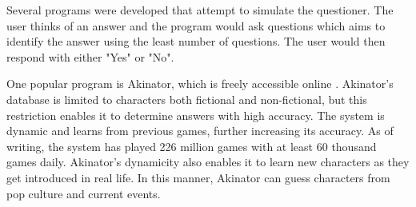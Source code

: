 Several programs were developed that attempt to simulate the questioner. 
The user thinks of an answer and the program would ask questions which aims to identify the answer using the least number of questions. The user would then respond with either "Yes" or "No".

One popular program is Akinator, which is freely accessible online \cite{Akinator:2016}.
Akinator's database is limited to characters both fictional and non-fictional, but this restriction enables it to determine answers with high accuracy.
The system is dynamic and learns from previous games, further increasing its accuracy.
As of writing, the system has played 226 million games with at least 60 thousand games daily.
Akinator's dynamicity also enables it to learn new characters as they get introduced in real life.
In this manner, Akinator can guess characters from pop culture and current events.


